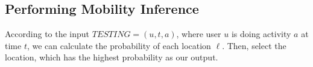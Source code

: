 \subsection{Performing Mobility Inference}

According to the input $TESTING = {(u, t, a)}$, where user $u$ is doing activity $a$ at time $t$, we can calculate the probability of each location $\ell$. Then, select the location, which has the highest probability as our output.



